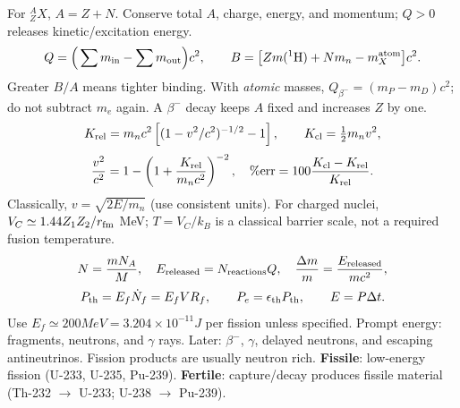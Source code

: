 \begin{handoutcolumns}
For ${}^{A}_{Z}X$, $A=Z+N$. Conserve total $A$, charge, energy,
and momentum; $Q>0$ releases kinetic/excitation energy.
\[
 Q=\Big(\sum m_{\rm in}-\sum m_{\rm out}\Big)c^2,
 \qquad B=\big[Z m({}^{1}{\rm H})+Nm_n-m_{
 X}^{\rm atom}\big]c^2.
\]
Greater $B/A$ means tighter binding. With \emph{atomic} masses,
$Q_{\beta^-}=(m_P-m_D)c^2$; do not subtract $m_e$ again.
A $\beta^-$ decay keeps $A$ fixed and increases $Z$ by one.
\[
 K_{\rm rel}=m_nc^2\left[(1-v^2/c^2)^{-1/2}-1\right],
 \qquad K_{\rm cl}=\tfrac12m_nv^2,
\]
\[
 \frac{v^2}{c^2}=1-\left(1+\frac{K_{\rm rel}}{m_nc^2}\right)^{-2},
 \quad \%\mathrm{err}=100\frac{K_{\rm cl}-K_{\rm rel}}{K_{\rm rel}}.
\]
Classically, $v=\sqrt{2E/m_n}$ (use consistent units).
For charged nuclei, $V_C\simeq1.44Z_1Z_2/r_{\rm fm}$ MeV;
$T=V_C/k_B$ is a classical barrier scale, not a required fusion temperature.
\[
 N=\frac{mN_A}{M},\quad E_{\rm released}=N_{\rm reactions}Q,
 \quad \frac{\Delta m}{m}=\frac{E_{\rm released}}{mc^2},
\]
\[
 P_{\rm th}=E_f\dot N_f=E_fVR_f,
 \qquad P_e=\epsilon_{\rm th}P_{\rm th},\qquad E=P\Delta t.
\]
Use $E_f\simeq200\unit{MeV}=3.204\times10^{-11}\unit{J}$ per
fission unless specified. Prompt energy: fragments, neutrons, and
$\gamma$ rays. Later: $\beta^-$, $\gamma$, delayed neutrons, and
escaping antineutrinos. Fission products are usually neutron rich.
\textbf{Fissile}: low-energy fission (U-233, U-235, Pu-239).
\textbf{Fertile}: capture/decay produces fissile material
(Th-232 $\to$ U-233; U-238 $\to$ Pu-239).


\end{handoutcolumns}

